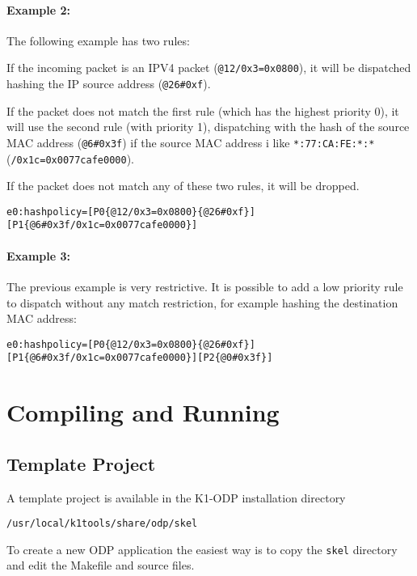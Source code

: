 \documentclass{trkalray}
\begin{document}
\paragraph{Example 2:}

The following example has two rules:

If the incoming packet is an IPV4 packet (\texttt{@12/0x3=0x0800}),
 it will be dispatched hashing the IP source address
 (\texttt{@26\#0xf}).

If the packet does not match the first rule
(which has the highest priority 0), it will use the second rule (with
priority 1), dispatching with the hash of the source MAC address
(\texttt{@6\#0x3f}) if the source MAC address i like
\texttt{*:77:CA:FE:*:*} (\texttt{/0x1c=0x0077cafe0000}).

If the packet
does not match any of these two rules, it will be dropped.
\begin{lstlisting}
e0:hashpolicy=[P0{@12/0x3=0x0800}{@26#0xf}][P1{@6#0x3f/0x1c=0x0077cafe0000}]
\end{lstlisting}

\paragraph{Example 3:}

The previous example is very restrictive. It is possible to add a low priority
rule to dispatch without any match restriction, for example hashing the
destination MAC address:
\begin{lstlisting}
e0:hashpolicy=[P0{@12/0x3=0x0800}{@26#0xf}][P1{@6#0x3f/0x1c=0x0077cafe0000}][P2{@0#0x3f}]
\end{lstlisting}


\section{Compiling and Running}

\subsection{Template Project}
A template project is available in the K1-ODP installation directory
\begin{lstlisting}
/usr/local/k1tools/share/odp/skel
\end{lstlisting}

To create a new ODP application the easiest way is to copy the
\texttt{skel} directory and edit the Makefile and source files.
\end{document}
